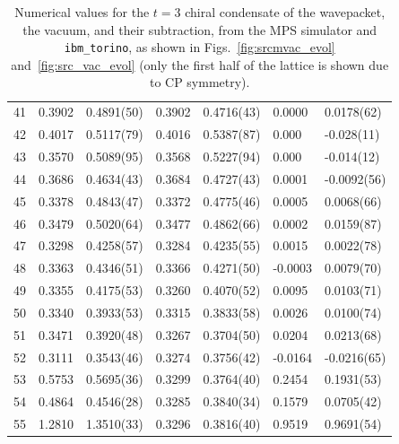 \documentclass[aps, prc, tightenlines,superscriptaddress, letterpaper, amsmath, amssymb, preprintnumbers, floatfix, longbibliography, nofootinbib]{revtex4-2}
\begin{document}
\begin{table}[!htb]
{\begin{tabularx}{\textwidth}{| c || Y | Y | Y | Y | Y | Y |}
41	&	0.3902	&	0.4891(50)	&	0.3902	&	0.4716(43)	&	0.0000	&	0.0178(62)	\\
42	&	0.4017	&	0.5117(79)	&	0.4016	&	0.5387(87)	&	0.000	&	-0.028(11)	\\
43	&	0.3570	&	0.5089(95)	&	0.3568	&	0.5227(94)	&	0.000	&	-0.014(12)	\\
44	&	0.3686	&	0.4634(43)	&	0.3684	&	0.4727(43)	&	0.0001	&	-0.0092(56)	\\
45	&	0.3378	&	0.4843(47)	&	0.3372	&	0.4775(46)	&	0.0005	&	0.0068(66)	\\
46	&	0.3479	&	0.5020(64)	&	0.3477	&	0.4862(66)	&	0.0002	&	0.0159(87)	\\
47	&	0.3298	&	0.4258(57)	&	0.3284	&	0.4235(55)	&	0.0015	&	0.0022(78)	\\
48	&	0.3363	&	0.4346(51)	&	0.3366	&	0.4271(50)	&	-0.0003	&	0.0079(70)	\\
49	&	0.3355	&	0.4175(53)	&	0.3260	&	0.4070(52)	&	0.0095	&	0.0103(71)	\\
50	&	0.3340	&	0.3933(53)	&	0.3315	&	0.3833(58)	&	0.0026	&	0.0100(74)	\\
51	&	0.3471	&	0.3920(48)	&	0.3267	&	0.3704(50)	&	0.0204	&	0.0213(68)	\\
52	&	0.3111	&	0.3543(46)	&	0.3274	&	0.3756(42)	&	-0.0164	&	-0.0216(65)	\\
53	&	0.5753	&	0.5695(36)	&	0.3299	&	0.3764(40)	&	0.2454	&	0.1931(53)	\\
54	&	0.4864	&	0.4546(28)	&	0.3285	&	0.3840(34)	&	0.1579	&	0.0705(42)	\\
55	&	1.2810	&	1.3510(33)	&	0.3296	&	0.3816(40)	&	0.9519	&	0.9691(54)	\\ \hline
\end{tabularx}}
\caption{Numerical values for the $t=3$ chiral condensate of the wavepacket, the vacuum, and their subtraction, from the MPS simulator and {\tt ibm\_torino}, as shown in Figs.~\ref{fig:srcmvac_evol} and~\ref{fig:src_vac_evol} (only the first half of the lattice is shown due to CP symmetry).}
 \label{tab:tablet3}
\end{table}
%
\end{document}

